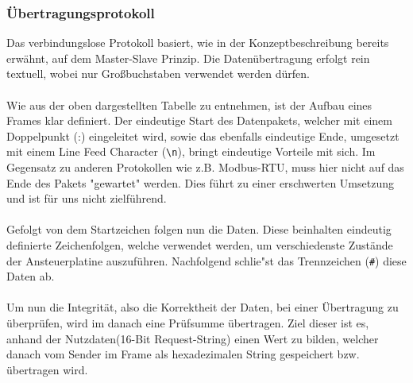 \subsubsection{Übertragungsprotokoll} \label{sssec:uebertragungsprotokoll}
\begin{table}[H]
    \centering
{}
    \caption{Visualisierung des Datenakets}
\end{table}
Das verbindungslose Protokoll basiert, wie in der Konzeptbeschreibung bereits erwähnt, auf dem Master-Slave Prinzip.
Die Datenübertragung erfolgt rein textuell, wobei nur Großbuchstaben verwendet werden dürfen.\\\\
Wie aus der oben dargestellten Tabelle zu entnehmen, ist der Aufbau eines Frames klar definiert.
Der eindeutige Start des Datenpakets, welcher mit einem Doppelpunkt (:) eingeleitet wird, sowie das ebenfalls eindeutige Ende, umgesetzt mit einem Line Feed Character (\verb!\n!), bringt eindeutige Vorteile mit sich.
Im Gegensatz zu anderen Protokollen wie z.B. Modbus-RTU, muss hier nicht auf das Ende des Pakets "gewartet" werden.
Dies führt zu einer erschwerten Umsetzung und ist für uns nicht zielführend.\\\\
Gefolgt von dem Startzeichen folgen nun die Daten.
Diese beinhalten eindeutig definierte Zeichenfolgen, welche verwendet werden, um verschiedenste Zustände der Ansteuerplatine auszuführen.
Nachfolgend schlie"st das Trennzeichen (\verb!#!) diese Daten ab.\\\\
Um nun die Integrität, also die Korrektheit der Daten, bei einer Übertragung zu überprüfen, wird im danach eine Prüfsumme übertragen.
Ziel dieser ist es, anhand der Nutzdaten(16-Bit Request-String) einen Wert zu bilden, welcher danach vom Sender im Frame als hexadezimalen String gespeichert bzw. übertragen wird.
